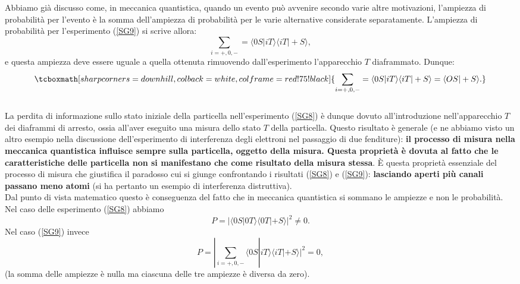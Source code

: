 \documentclass[a4paper,12pt,oneside]{book}
\begin{document}
Abbiamo già discusso come, in meccanica quantistica, quando un evento può avvenire secondo varie altre motivazioni, l'ampiezza di probabilità per l'evento è la somma dell'ampiezza di probabilità per le varie alternative considerate separatamente. L'ampiezza di probabilità per l'esperimento (\ref{SG9}) si scrive allora:
	\begin{equation}
		\sum\limits_{i=+,0,-}=\langle 0S | iT \rangle \langle iT | +S \rangle ,
	\end{equation}
e questa ampiezza deve essere uguale a quella ottenuta rimuovendo  dall'esperimento l'apparecchio $T$ diaframmato. Dunque:
	\begin{equation}
		\tcboxmath[sharp corners=downhill ,colback=white,colframe=red!75!black]{
			\sum\limits_{i=+,0,-}=\langle 0S | iT \rangle \langle iT | +S \rangle = \langle OS | +S \rangle .
			}
 	\label{cap3_2}
	\end{equation}\\

La perdita di informazione sullo stato iniziale della particella nell'esperimento (\ref{SG8}) è dunque dovuto all'introduzione nell'apparecchio $T$ dei diaframmi di arresto, ossia all'aver eseguito una misura dello stato $T$ della particella. Questo risultato è generale (e ne abbiamo visto un altro esempio nella discussione dell'esperimento di interferenza degli elettroni nel passaggio di due fenditure): \textbf{il processo di misura nella meccanica quantistica influisce sempre sulla particella, oggetto della misura. Questa proprietà è dovuta al fatto che le caratteristiche delle particella non si manifestano che come risultato della misura stessa}. È questa proprietà essenziale del processo di misura che giustifica il paradosso cui si giunge confrontando i risultati (\ref{SG8}) e (\ref{SG9}): \textbf{lasciando aperti più canali passano meno atomi} (si ha pertanto un esempio di interferenza distruttiva).\\

Dal punto di vista matematico questo è conseguenza del fatto che in meccanica quantistica si sommano le ampiezze e non le probabilità. Nel caso delle esperimento (\ref{SG8}) abbiamo
	\begin{equation}
		P= | \langle 0S | 0T \rangle \langle 0T | +S \rangle  |^2 \neq 0 .
	\end{equation}
Nel caso (\ref{SG9}) invece
	\begin{equation}
		P= |\sum \limits_{i=+,0,-}\langle 0S | iT \rangle \langle iT | +S \rangle |^2 =0 ,
	\end{equation}
(la somma delle ampiezze è nulla ma ciascuna delle tre ampiezze è diversa da zero).\\
\end{document}

